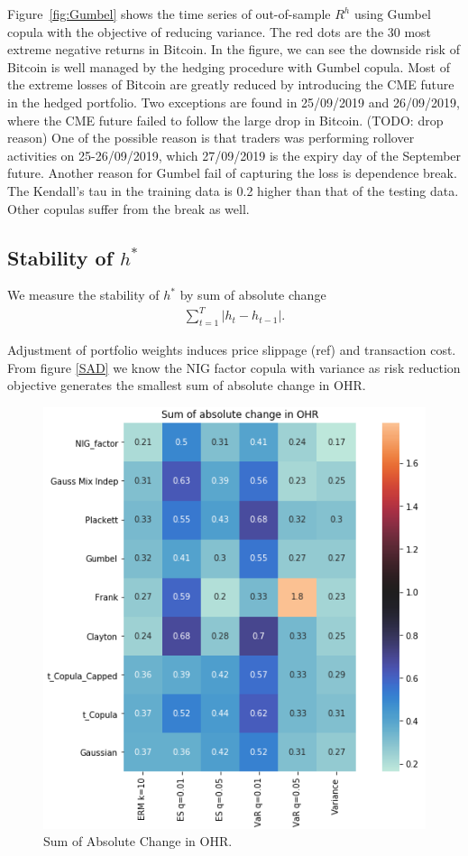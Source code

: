 Figure~\ref{fig:Gumbel} shows the time series of out-of-sample $R^h$ using Gumbel copula with the
objective of reducing variance.
The red dots are the 30 most extreme negative returns in Bitcoin.
In the figure, we can see the downside risk of Bitcoin is well managed by the hedging procedure with Gumbel copula.
Most of the extreme losses of Bitcoin are greatly reduced by introducing the CME future in the hedged portfolio.
Two exceptions are found in 25/09/2019 and 26/09/2019, where the CME future failed to follow the large drop in Bitcoin. (TODO: drop reason)
One of the possible reason is that traders was performing rollover activities on 25-26/09/2019, which
27/09/2019 is the expiry day of the September future.
Another reason for Gumbel fail of capturing the loss is dependence break.
The Kendall's tau in the training data is 0.2 higher than that of the testing data.
Other copulas suffer from the break as well.



\subsection{Stability of $h^*$}
We measure the stability of $h^*$ by sum of absolute change
\begin{align}
    \sum_{t=1}^T|h_t - h_{t-1}|.
    \end{align}

Adjustment of portfolio weights induces price slippage (ref) and transaction cost.
From figure \ref{SAD} we know the NIG factor copula with variance as risk reduction objective generates the smallest
sum of absolute change in OHR.

\begin{figure}[!th]
   \centering
   \includegraphics[width=\textwidth]{_pics/Sum of absolute change in OHR.png}
   \caption{Sum of Absolute Change in OHR.
   }
   \label{fig:SAD}
\end{figure}

